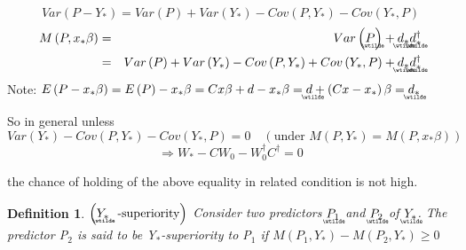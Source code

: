 \documentclass{article}
\newtheorem{definition}[theorem]{Definition}
\begin{document}
\begin{equation*}
Var\left( P-Y_{\ast }\right) =Var\left( P\right) +Var\left( Y_{\ast }\right)
-Cov\left( P,Y_{\ast }\right) -Cov\left( Y_{\ast },P\right) 
\end{equation*}%
\begin{eqnarray*}
M\left( P,x_{\ast }\beta \right)  &=&Var\left( 
\underaccent{\wtilde}{P}%
\right) +%
\underaccent{\wtilde}{d}%
_{\ast }%
\underaccent{\wtilde}{d}%
_{\ast }^{\dagger } \\
&=&Var\left( P\right) +Var\left( Y_{\ast }\right) -Cov\left( P,Y_{\ast
}\right) +Cov\left( Y_{\ast },P\right) +%
\underaccent{\wtilde}{d}%
_{\ast }%
\underaccent{\wtilde}{d}%
_{\ast }^{\dagger }
\end{eqnarray*}%
Note: $E\left( P-x_{\ast }\beta \right) =E\left( P\right) -x_{\ast }\beta
=Cx\beta +d-x_{\ast }\beta =%
\underaccent{\wtilde}{d}%
+\left( Cx-x_{\ast }\right) \beta =%
\underaccent{\wtilde}{d}%
_{\ast }$

\bigskip 

So in general unless%
\begin{equation*}
Var\left( Y_{\ast }\right) -Cov\left( P,Y_{\ast }\right) -Cov\left( Y_{\ast
},P\right) =0\quad \left( \text{under }M\left( P,Y_{\ast }\right) =M\left(
P,x_{\ast }\beta \right) \right) 
\end{equation*}%
\begin{equation*}
\Rightarrow W_{\ast }-CW_{0}-W_{0}^{\dagger }C^{\dagger }=0
\end{equation*}

the chance of holding of the above equality in related condition is not high.

\bigskip 

\begin{definition}
$\left( 
\underaccent{\wtilde}{Y}%
_{\ast }\text{-superiority}\right) $\newline
Consider two predictors $%
\underaccent{\wtilde}{P}%
_{1}$ and $%
\underaccent{\wtilde}{P}%
_{2}$ of $%
\underaccent{\wtilde}{Y}%
_{\ast }$. The predictor P$_{2}$ is said to be Y$_{\ast }$-superiority to P$%
_{1}$ if $M\left( P_{1},Y_{\ast }\right) -M\left( P_{2},Y_{\ast }\right)
\geq 0$
\end{definition}
\end{document}
